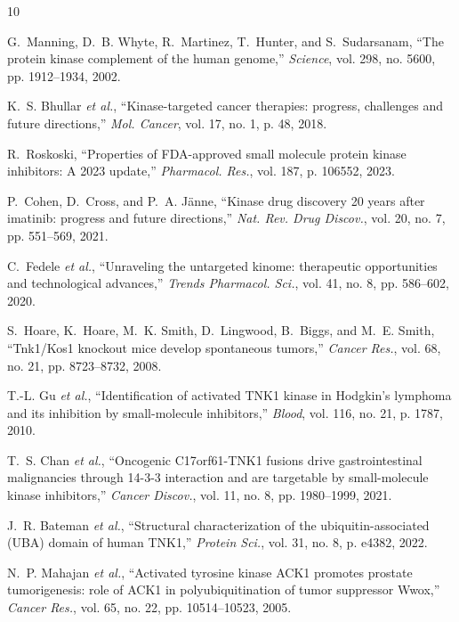 \documentclass[journal]{IEEEtran}
\begin{document}
\begin{thebibliography}{10}

G.~Manning, D.~B. Whyte, R.~Martinez, T.~Hunter, and S.~Sudarsanam, ``The protein kinase complement of the human genome,'' \emph{Science}, vol. 298, no. 5600, pp. 1912--1934, 2002.

K.~S. Bhullar \emph{et al.}, ``Kinase-targeted cancer therapies: progress, challenges and future directions,'' \emph{Mol. Cancer}, vol. 17, no. 1, p. 48, 2018.

R.~Roskoski, ``Properties of FDA-approved small molecule protein kinase inhibitors: A 2023 update,'' \emph{Pharmacol. Res.}, vol. 187, p. 106552, 2023.

P.~Cohen, D.~Cross, and P.~A. J{\"a}nne, ``Kinase drug discovery 20 years after imatinib: progress and future directions,'' \emph{Nat. Rev. Drug Discov.}, vol. 20, no. 7, pp. 551--569, 2021.

C.~Fedele \emph{et al.}, ``Unraveling the untargeted kinome: therapeutic opportunities and technological advances,'' \emph{Trends Pharmacol. Sci.}, vol. 41, no. 8, pp. 586--602, 2020.

S.~Hoare, K.~Hoare, M.~K. Smith, D.~Lingwood, B.~Biggs, and M.~E. Smith, ``Tnk1/Kos1 knockout mice develop spontaneous tumors,'' \emph{Cancer Res.}, vol. 68, no. 21, pp. 8723--8732, 2008.

T.-L. Gu \emph{et al.}, ``Identification of activated TNK1 kinase in Hodgkin's lymphoma and its inhibition by small-molecule inhibitors,'' \emph{Blood}, vol. 116, no. 21, p. 1787, 2010.

T.~S. Chan \emph{et al.}, ``Oncogenic C17orf61-TNK1 fusions drive gastrointestinal malignancies through 14-3-3 interaction and are targetable by small-molecule kinase inhibitors,'' \emph{Cancer Discov.}, vol. 11, no. 8, pp. 1980--1999, 2021.

J.~R. Bateman \emph{et al.}, ``Structural characterization of the ubiquitin-associated (UBA) domain of human TNK1,'' \emph{Protein Sci.}, vol. 31, no. 8, p. e4382, 2022.

N.~P. Mahajan \emph{et al.}, ``Activated tyrosine kinase ACK1 promotes prostate tumorigenesis: role of ACK1 in polyubiquitination of tumor suppressor Wwox,'' \emph{Cancer Res.}, vol. 65, no. 22, pp. 10514--10523, 2005.


\end{thebibliography}
\end{document}
